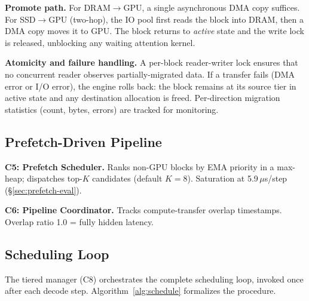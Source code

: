 \documentclass[conference]{IEEEtran}
\begin{document}
\textbf{Promote path.} For DRAM$\to$GPU, a single asynchronous DMA copy suffices. For SSD$\to$GPU (two-hop), the IO pool first reads the block into DRAM, then a DMA copy moves it to GPU. The block returns to \emph{active} state and the write lock is released, unblocking any waiting attention kernel.

\textbf{Atomicity and failure handling.} A per-block reader-writer lock ensures that no concurrent reader observes partially-migrated data. If a transfer fails (DMA error or I/O error), the engine rolls back: the block remains at its source tier in active state and any destination allocation is freed. Per-direction migration statistics (count, bytes, errors) are tracked for monitoring.

\subsection{Prefetch-Driven Pipeline}
\label{sec:pipeline}


\textbf{C5: Prefetch Scheduler.} Ranks non-GPU blocks by EMA priority in a max-heap; dispatches top-$K$ candidates (default $K{=}8$). Saturation at 5.9\,$\mu$s/step (\S\ref{sec:prefetch-eval}).

\textbf{C6: Pipeline Coordinator.} Tracks compute-transfer overlap timestamps. Overlap ratio 1.0 = fully hidden latency.

\subsection{Scheduling Loop}

The tiered manager (C8) orchestrates the complete scheduling loop, invoked once after each decode step. Algorithm~\ref{alg:schedule} formalizes the procedure.
\end{document}
